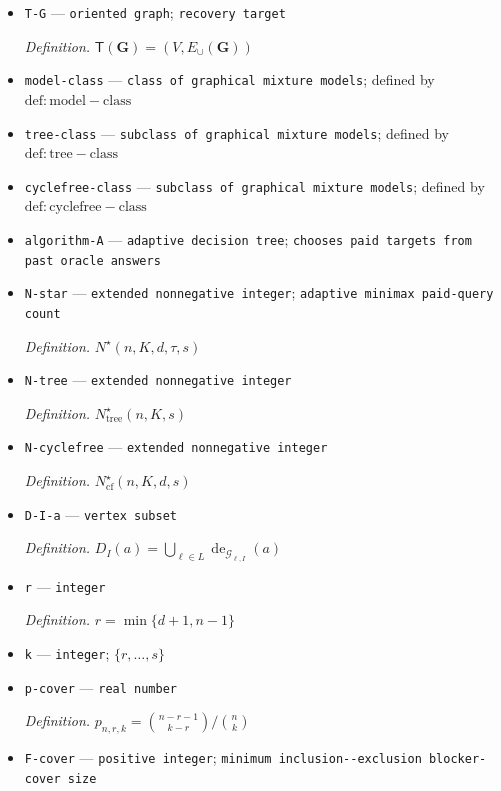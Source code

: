 \documentclass{article}
\begin{document}
\begin{itemize}
  \item \texttt{T-\allowbreak{}G} --- \texttt{oriented graph}; \texttt{recovery target}
  \par\smallskip\noindent\emph{Definition.} \(\mathsf T(\mathbf G)=(V,E_{\cup}(\mathbf G))\)
  \item \texttt{model-\allowbreak{}class} --- \texttt{class of graphical mixture models}; defined by \(\mathrm{def:model-class}\)
  \item \texttt{tree-\allowbreak{}class} --- \texttt{subclass of graphical mixture models}; defined by \(\mathrm{def:tree-class}\)
  \item \texttt{cyclefree-\allowbreak{}class} --- \texttt{subclass of graphical mixture models}; defined by \(\mathrm{def:cyclefree-class}\)
  \item \texttt{algorithm-\allowbreak{}A} --- \texttt{adaptive decision tree}; \texttt{chooses paid targets from past oracle answers}
  \item \texttt{N-\allowbreak{}star} --- \texttt{extended nonnegative integer}; \texttt{adaptive minimax paid-\allowbreak{}query count}
  \par\smallskip\noindent\emph{Definition.} \(N^{\star}(n,K,d,\tau,s)\)
  \item \texttt{N-\allowbreak{}tree} --- \texttt{extended nonnegative integer}
  \par\smallskip\noindent\emph{Definition.} \(N^{\star}_{\mathrm{tree}}(n,K,s)\)
  \item \texttt{N-\allowbreak{}cyclefree} --- \texttt{extended nonnegative integer}
  \par\smallskip\noindent\emph{Definition.} \(N^{\star}_{\mathrm{cf}}(n,K,d,s)\)
  \item \texttt{D-\allowbreak{}I-\allowbreak{}a} --- \texttt{vertex subset}
  \par\smallskip\noindent\emph{Definition.} \(D_I(a)=\bigcup_{\ell\in L}\operatorname{de}_{\mathcal G_{\ell,I}}(a)\)
  \item \texttt{r} --- \texttt{integer}
  \par\smallskip\noindent\emph{Definition.} \(r=\min\{d+1,n-1\}\)
  \item \texttt{k} --- \texttt{integer}; \(\{r,\ldots,s\}\)
  \item \texttt{p-\allowbreak{}cover} --- \texttt{real number}
  \par\smallskip\noindent\emph{Definition.} \(p_{n,r,k}=\binom{n-r-1}{k-r}/\binom nk\)
  \item \texttt{F-\allowbreak{}cover} --- \texttt{positive integer}; \texttt{minimum inclusion-\allowbreak{}-\allowbreak{}exclusion blocker-\allowbreak{}cover size}

\end{itemize}
\end{document}
